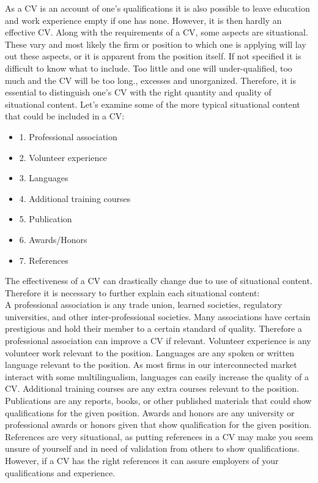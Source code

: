 As a CV is an account of one’s qualifications it is also possible to leave education and work experience empty if one has none.
However, it is then hardly an effective CV.\cite{Difference_between_resume_and_curriculum_Vitae}
Along with the requirements of a CV, some aspects are situational.
These vary and most likely the firm or position to which one is applying will lay out these aspects, or it is apparent from the position itself.
If not specified it is difficult to know what to include. Too little and one will under-qualified, too much and the CV will be too long.\cite{Job_Application_for_science}, excesses and unorganized.
Therefore, it is essential to distinguish one’s CV with the right quantity and quality of situational content.
Let's examine some of the more typical situational content that could be included in a CV: \\
\begin{itemize}
   \item 1. Professional association
   \item 2. Volunteer experience
   \item 3. Languages
   \item 4. Additional training courses
   \item 5. Publication
   \item 6. Awards/Honors
   \item 7. References\cite{6_sections} \\
\end{itemize}
The effectiveness of a CV can drastically change due to use of situational content.
Therefore it is necessary to further explain each situational content: \\
A professional association is any trade union, learned societies, regulatory universities, and other inter-professional societies.
Many associations have certain prestigious and hold their member to a certain standard of quality.
Therefore a professional association can improve a CV if relevant.\cite{Professional_associations_and_organizations}\cite{Perks_of_professional_organizations}
Volunteer experience is any volunteer work relevant to the position.
Languages are any spoken or written language relevant to the position.
As most firms in our interconnected market interact with some multilingualism, languages can easily increase the quality of a CV.
Additional training courses are any extra courses relevant to the position. 
Publications are any reports, books, or other published materials that could show qualifications for the given position.
Awards and honors are any university or professional awards or honors given that show qualification for the given position.
References are very situational, as putting references in a CV may make you seem unsure of yourself and in need of validation from others to show qualifications.
However, if a CV has the right references it can assure employers of your qualifications and experience. \\

